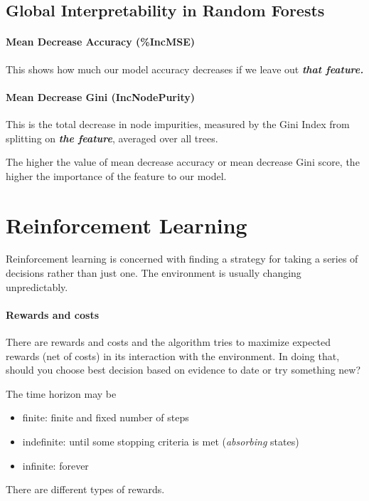 \subsection{Global Interpretability in Random Forests}

\paragraph{Mean Decrease Accuracy (\%IncMSE)}
This shows how much our model accuracy decreases if we leave out \textit{\textbf{that feature.}}

\paragraph{Mean Decrease Gini (IncNodePurity)}
This is the total decrease in node impurities, measured by the Gini Index from splitting on \textit{\textbf{the feature}}, averaged over all trees.

The higher the value of mean decrease accuracy or mean decrease Gini score, the higher the importance of the feature to our model.

\section{Reinforcement Learning}

Reinforcement learning is concerned with finding a strategy for taking a series of decisions rather than just one.
The environment is usually changing unpredictably.

\paragraph{Rewards and costs}
There are rewards and costs and the algorithm tries to maximize expected rewards (net of costs) in its interaction with the environment. In doing that, should you choose best decision based on evidence to date or try something new?

The time horizon may be
\begin{itemize}
    \item finite: finite and fixed number of steps
    \item indefinite: until some stopping criteria is met (\emph{absorbing} states)
    \item infinite: forever
\end{itemize}

There are different types of rewards.

